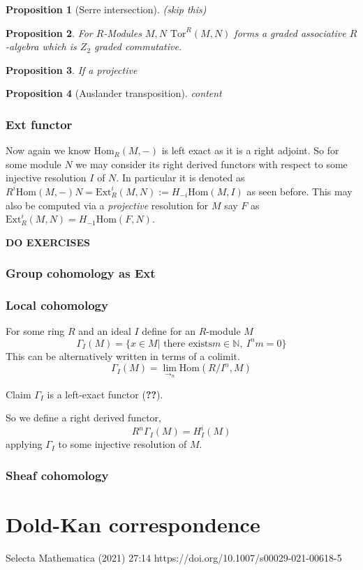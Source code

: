 \documentclass[12pt]{article}
\numberwithin{equation}{section}
\newcommand{\N}{\mathbb{N}}
\newcommand{\Hom}{{\mathrm{Hom}}}
\newtheorem{proposition}{Proposition}[section]
\begin{document}
	\begin{proposition}[Serre intersection](skip this)
	\end{proposition}
	
	\begin{proposition}
		For $R$-Modules $M,N$ \( \mathrm{Tor}^R(M,N) \) forms a graded associative $R$-algebra which is $Z_2$ graded commutative.
	\end{proposition}
	\begin{proposition}
		If a projective
	\end{proposition}
	\begin{proposition}[Auslander transposition]
		content
	\end{proposition}
	\subsubsection{Ext functor}
	Now again we know $\Hom_R(M,-)$ is left exact as it is a right adjoint. So for some module $N$ we may consider its right derived functors with respect to some injective resolution $I$ of $N$. In particular it is denoted as $R^i \Hom(M,-)N= \mathrm{Ext}_R^i(M,N):= H_{-i} \Hom(M,I)$ as seen before. This may also be computed via a \textit{projective} resolution for $M$ say $F$ as $\mathrm{Ext}_R^i (M,N)= H_{-1} \Hom(F,N)$.
	
	
	\textbf{DO EXERCISES}
	\subsubsection{Group cohomology as Ext}
	
	\subsubsection{Local cohomology}
	For some ring $R$ and an ideal $I$ define for an $R$-module $M$ $$\Gamma_I(M)=\{x \in M | \text{ there exists} m \in \N,\ I^n m =0\}$$
	This can be alternatively written in terms of a colimit.\[ \Gamma_I(M)= \lim_{\to_n} \Hom (R/I^n, M) \]
	
	Claim $\Gamma_I $ is a left-exact functor (\textbf{??}).
	
	So we define a right derived functor, \[ R^n \Gamma_I(M)=H_I^i(M) \] applying $\Gamma_I $ to some injective resolution of $M$.
	\subsubsection{Sheaf cohomology}
	
	\section{Dold-Kan correspondence}
	Selecta Mathematica (2021) 27:14
	https://doi.org/10.1007/s00029-021-00618-5	
\end{document}

